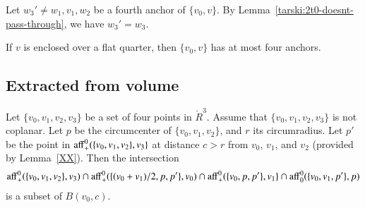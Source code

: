 \begin{tarskidata}
\begin{tarski}
\begin{proved}
Let $w_3'\ne w_1,v_1,w_2$ be a fourth anchor of $\{v_0,v\}$. By
Lemma~\ref{tarski:2t0-doesnt-pass-through}, we have $w_3'=w_3$.
\swallowed\end{proved}
\end{tarski}



\begin{tarski}

\begin{lemma}
If $v$ is enclosed over a flat quarter, then $\{v_0,v\}$ has at most four
anchors.
\end{lemma}

\begin{proved}
\swallowed\end{proved}
\end{tarski}









\begin{tarski}
\section{Extracted from volume}
\rating{}

\begin{lemma}
Let $\{v_0,v_1,v_2,v_3\}$ be a set of four points in $\ring{R}^3$.
Assume that $\{v_0,v_1,v_2,v_3\}$ is not coplanar.  Let $p$
be the circumcenter of $\{v_0,v_1,v_2\}$, and $r$ its circumradius.  
Let $p'$ be the
point in ${\operatorname{aff}}_+^0(\{v_0,v_1,v_2\},v_3\}$ at distance
$c > r$ from $v_0$, $v_1$, and $v_2$ (provided by Lemma~\ref{XX}). %
Then the intersection
  $$
  {\operatorname{aff}}^0_+(\{v_0,v_1,v_2\},v_3) \cap
  {\operatorname{aff}}^0_+(\{(v_0+v_1)/2,p,p' \},v_0) \cap
  {\operatorname{aff}}^0_+(\{v_0,p,p'\},v_1\}\cap
  {\operatorname{aff}}^0_0(\{v_0,v_1,p'\},p)
  $$
is a subset of $B(v_0,c)$.
\end{lemma}

\begin{proved}
\swallowed\end{proved}
\end{tarski}






\end{tarskidata}
